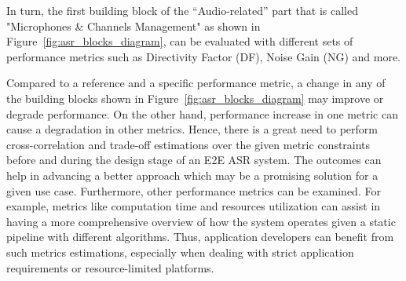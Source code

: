



\bigskip

In turn, the first building block of the 
``Audio-related'' part that is called 
"Microphones \& Channels Management" as shown 
in Figure~\ref{fig:asr_blocks_diagram},
can be evaluated with 
different sets of performance metrics 
such as Directivity Factor (DF),
Noise Gain (NG) and more.

Compared to a reference and a specific performance metric, 
a change in any of the building blocks 
shown in Figure~\ref{fig:asr_blocks_diagram} may 
improve or degrade performance. 
On the other hand,
performance increase in one metric can cause 
a degradation in other metrics.
Hence, there is a great need 
to perform cross-correlation and trade-off estimations 
over the given metric constraints 
before and during the design stage of an E2E ASR system. 
The outcomes can help in advancing a better approach
which may be a promising solution for a given use case. 
Furthermore, other performance metrics can be examined.
For example, metrics like computation time and resources utilization
can assist in having a more comprehensive overview of how the system operates given a
static pipeline with different algorithms.
Thus, application
developers can benefit from such metrics estimations,
especially when dealing with strict 
application requirements or resource-limited platforms.


